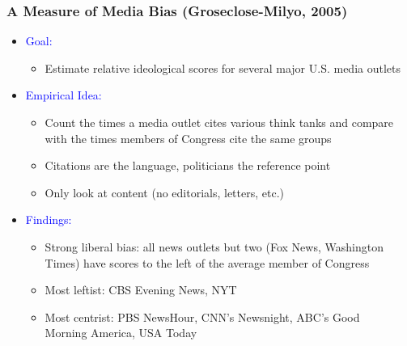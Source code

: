 \documentclass[english]{beamer}
\begin{document}
\begin{frame}

\frametitle{A Measure of Media Bias (Groseclose-Milyo, 2005)}

\begin{itemize}
\setlength{\itemsep}{0.9em}

\item{\textcolor{blue}{\large Goal:}
\vspace*{5pt}
\begin{itemize}
\setlength{\itemsep}{0.5em}
\setlength{\itemindent}{-1em}
\item{Estimate relative ideological scores for several major U.S. media outlets}
\end{itemize}}

\pause

\item{\textcolor{blue}{\large Empirical Idea:}
\vspace*{5pt}
\begin{itemize}
\setlength{\itemsep}{0.5em}
\setlength{\itemindent}{-1em}
\item{Count the times a media outlet cites various think tanks and compare\\
\hspace{-9pt}with the times members of Congress cite the same groups}
\item{Citations are the language, politicians the reference point}
\item{Only look at content (no editorials, letters, etc.)}
\end{itemize}}

\pause

\item{\textcolor{blue}{\large Findings:}
\vspace*{5pt}
\begin{itemize}
\setlength{\itemsep}{0.5em}
\setlength{\itemindent}{-1em}
\item{Strong liberal bias: all news outlets but two (Fox News, Washington\\
\hspace{-10pt}Times) have scores to the left of the average member of Congress}
\item{Most leftist: CBS Evening News, NYT}
\item{Most centrist: PBS NewsHour, CNN's Newsnight, ABC's Good\\
\hspace{-10pt}Morning America, USA Today}
\end{itemize}}
\end{itemize}
\end{frame}
\end{document}
